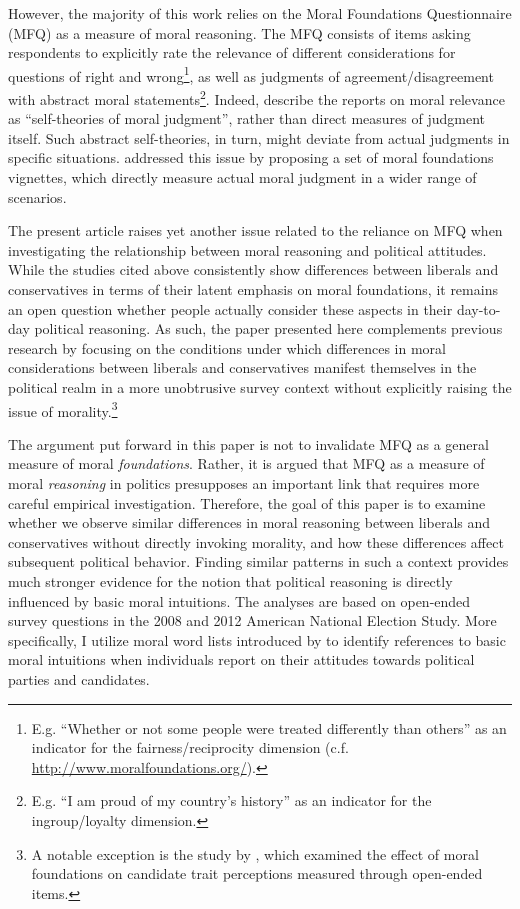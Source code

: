 \documentclass[12pt]{paper}
\begin{document}
However, the majority of this work relies on the Moral Foundations Questionnaire (MFQ) as a measure of moral reasoning. The MFQ consists of items asking respondents to explicitly rate the relevance of different considerations for questions of right and wrong\footnote{E.g. ``Whether or not some people were treated differently than others'' as an indicator for the fairness/reciprocity dimension (c.f. \url{http://www.moralfoundations.org/}).}, as well as judgments of agreement/disagreement with abstract moral statements\footnote{E.g. ``I am proud of my country’s history'' as an indicator for the ingroup/loyalty dimension.}. Indeed, \citet[1031]{graham2009liberals} describe the reports on moral relevance as ``self-theories of moral judgment'', rather than direct measures of judgment itself. Such abstract self-theories, in turn, might deviate from actual judgments in specific situations. \citet{clifford2015moral} addressed this issue by proposing a set of moral foundations vignettes, which directly measure actual moral judgment in a wider range of scenarios.

The present article raises yet another issue related to the reliance on MFQ when investigating the relationship between moral reasoning and political attitudes. While the studies cited above consistently show differences between liberals and conservatives in terms of their latent emphasis on moral foundations, it remains an open question whether people actually consider these aspects in their day-to-day political reasoning. As such, the paper presented here complements previous research by focusing on the conditions under which differences in moral considerations between liberals and conservatives manifest themselves in the political realm in a more unobtrusive survey context without explicitly raising the issue of morality.\footnote{A notable exception is the study by \citet{clifford2014linking}, which examined the effect of moral foundations on candidate trait perceptions measured through open-ended items.}

The argument put forward in this paper is not to invalidate MFQ as a general measure of moral \textit{foundations}. Rather, it is argued that MFQ as a measure of moral \textit{reasoning} in politics presupposes an important link that requires more careful empirical investigation. Therefore, the goal of this paper is to examine whether we observe similar differences in moral reasoning between liberals and conservatives without directly invoking morality, and how these differences affect subsequent political behavior. Finding similar patterns in such a context provides much stronger evidence for the notion that political reasoning is directly influenced by basic moral intuitions. The analyses are based on open-ended survey questions in the 2008 and 2012 American National Election Study. More specifically, I utilize moral word lists introduced by \citet{graham2009liberals} to identify references to basic moral intuitions when individuals report on their attitudes towards political parties and candidates.
\end{document}
